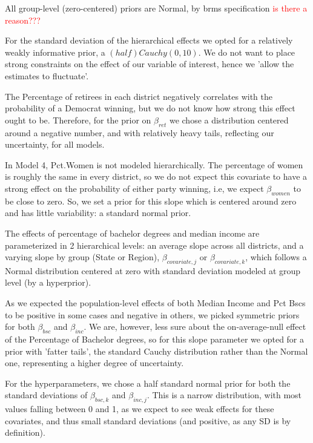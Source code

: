 \documentclass[12pt]{article}
\begin{document}
All group-level (zero-centered) priors are Normal, by brms specification \textcolor{red}{is there a reason???}

For the standard deviation of the hierarchical effects we opted for a relatively weakly informative prior, a $(half)Cauchy(0,10)$.
We do not want to place strong constraints on the effect of our variable of interest, hence we 'allow the estimates to fluctuate'.



The Percentage of retirees in each district negatively correlates with the probability of a Democrat winning, but we do not know how strong this effect ought to be. Therefore, for the prior on $\beta_{ret}$ we chose a distribution centered around a negative number, and with relatively heavy tails, reflecting our uncertainty, for all models. 



In Model 4, Pct.Women is not modeled hierarchically.
The percentage of women is roughly the same in every district, so we do not expect this covariate to have a strong effect on the probability of either party winning, i.e, we expect $\beta_{women}$ to be close to zero. So, we set a prior for this slope which is centered around zero and has little variability: a standard normal prior. 



The effects of percentage of bachelor degrees and median income are parameterized in 2 hierarchical levels: an average slope across all districts, and a varying slope by group (State or Region), $\beta_{covariate,j}$ or $\beta_{covariate,k}$, which follows a Normal distribution centered at zero with standard deviation modeled at group level (by a hyperprior).

 

As we expected the population-level effects of both Median Income and Pct Bscs to be positive in some cases and negative in others, we picked symmetric priors for both $\beta_{bsc}$ and $\beta_{inc}$. We are, however, less sure about the on-average-null effect of the Percentage of Bachelor degrees, so for this slope parameter we opted for a prior with 'fatter tails', the standard Cauchy distribution rather than the Normal one, representing a higher degree of uncertainty.


For the hyperparameters, we chose a half standard normal prior for both the standard deviations of $\beta_{bsc,k}$ and $\beta_{inc,j}$. This is a narrow distribution, with most values falling between 0 and 1, as we expect to see weak effects for these covariates, and thus small standard deviations (and positive, as any SD is by definition).
\end{document}
